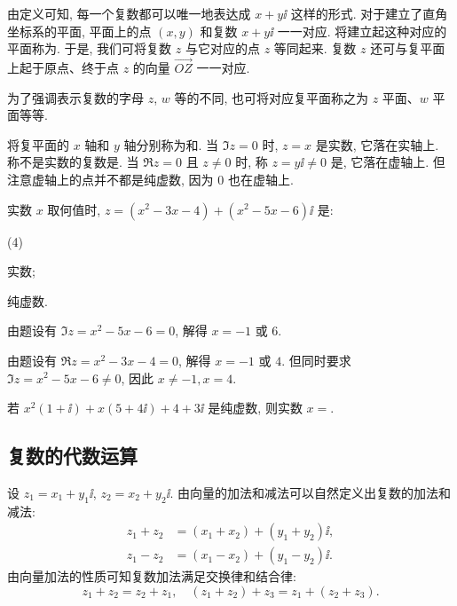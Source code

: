 由定义可知, 每一个复数都可以唯一地表达成 $x+y\ii$ 这样的形式.
对于建立了直角坐标系的平面, 平面上的点 $(x,y)$ 和复数 $x+y\ii$ 一一对应.
将建立起这种对应的平面称为.
于是, 我们可将复数 $z$ 与它对应的点 $z$ 等同起来.
复数 $z$ 还可与复平面上起于原点、终于点 $z$ 的向量 $\overrightarrow{OZ}$ 一一对应.

为了强调表示复数的字母 $z$, $w$ 等的不同, 也可将对应复平面称之为 $z$ 平面、$w$ 平面等等.

将复平面的 $x$ 轴和 $y$ 轴分别称为和.
当 $\Im z=0$ 时, $z=x$ 是实数, 它落在实轴上.
称不是实数的复数是.
当 $\Re z=0$ 且 $z\neq 0$ 时, 称 $z=y\ii\neq 0$ 是, 它落在虚轴上.
但注意虚轴上的点并不都是纯虚数, 因为 $0$ 也在虚轴上.

\begin{example}
  实数 $x$ 取何值时, $z=(x^2-3x-4)+(x^2-5x-6)\ii$ 是:
  \begin{subexample}(4)
    \item 实数;
    \item 纯虚数.
  \end{subexample}
\end{example}

\begin{solutionenum}
  \item 由题设有 $\Im z=x^2-5x-6=0$, 解得 $x=-1$ 或 $6$.
  \item 由题设有 $\Re z=x^2-3x-4=0$, 解得 $x=-1$ 或 $4$.
  但同时要求 $\Im z=x^2-5x-6\neq 0$, 因此 $x\neq -1, x=4$.
\end{solutionenum}

\begin{exercise}
  若 $x^2(1+\ii)+x(5+4\ii)+4+3\ii$ 是纯虚数, 则实数 $x=$\fillblank{}.
\end{exercise}


\subsection{复数的代数运算}

设 $z_1=x_1+y_1\ii$, $z_2=x_2+y_2\ii$.
由向量的加法和减法可以自然定义出复数的加法和减法:
\begin{align*}
  z_1+z_2&=(x_1+x_2)+(y_1+y_2)\ii,\\
  z_1-z_2&=(x_1-x_2)+(y_1-y_2)\ii.
\end{align*}
由向量加法的性质可知复数加法满足交换律和结合律:
\[
  z_1+z_2=z_2+z_1,\quad
  (z_1+z_2)+z_3=z_1+(z_2+z_3).
\]

